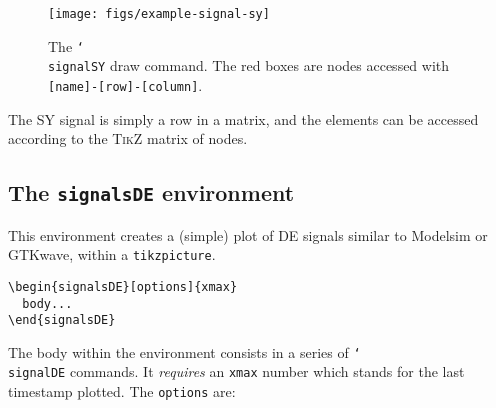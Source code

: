 \begin{figure}[htb]\centering
\texttt{[image: figs/example-signal-sy]}

\caption{The \texttt{\char`\\signalSY} draw command. The red boxes are nodes accessed with \texttt{[name]-[row]-[column]}.}
\end{figure}
\hspace{1pt}

\noindent The SY signal is simply a row in a matrix, and the elements can be accessed according to the \textsc{TikZ} matrix of nodes.

\subsection{The \texttt{signalsDE} environment}
\label{sec:plot-signalsDE}

This environment creates a (simple) plot of DE signals similar to Modelsim or GTKwave, within a \texttt{tikzpicture}.


\begin{verbatim}
\begin{signalsDE}[options]{xmax}
  body...
\end{signalsDE}
\end{verbatim}

The body within the environment consists in a series of \texttt{\char`\\signalDE} commands. It \emph{requires} an \texttt{xmax} number which stands for the last timestamp plotted. The \texttt{options} are:

